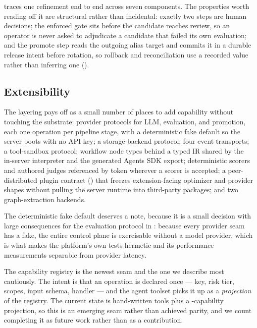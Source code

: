 

  traces one refinement end to end
across seven components. The properties worth reading off it are structural rather
than incidental: exactly two steps are human decisions; the enforced gate sits
before the candidate reaches review, so an operator is never asked to adjudicate a
candidate that failed its own evaluation; and the promote step reads the outgoing
alias target and commits it in a durable release intent before rotation, so rollback
and reconciliation use a recorded value rather than inferring one
().



\subsection{Extensibility}

The layering pays off as a small number of places to add capability without
touching the substrate: provider protocols for LLM, evaluation, and promotion, each
one operation per pipeline stage, with a deterministic fake default so the server
boots with no API key; a storage-backend protocol; four event transports; a
tool-sandbox protocol; \statNodeTypes{} workflow node types behind a typed IR
shared by the in-server interpreter and the generated Agents SDK export;
deterministic scorers and authored judges referenced by token wherever a scorer is
accepted; a peer-distributed plugin contract
() that freezes extension-facing optimizer and provider
shapes without pulling the server runtime into third-party packages; and two
graph-extraction backends.

The deterministic fake default deserves a note, because it is a small decision with
large consequences for the evaluation protocol in : because
every provider seam has a fake, the entire control plane is exercisable without a
model provider, which is what makes the platform's own tests hermetic and its
performance measurements separable from provider latency.

The \aria{} capability registry is the newest seam and the one we describe most
cautiously. The intent is that an operation is declared once --- key, risk tier,
scopes, input schema, handler --- and the agent toolset picks it up as a
\emph{projection} of the registry. The current state is \statAriaTools{}
hand-written tools plus a \statAriaProjected{}-capability projection, so this is an
emerging seam rather than achieved parity, and we count completing it as future work
rather than as a contribution.

